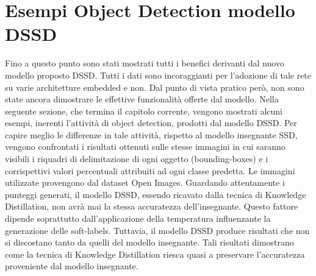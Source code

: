 \section{Esempi Object Detection modello DSSD}
Fino a questo punto sono stati mostrati tutti i benefici derivanti dal nuovo modello proposto DSSD. Tutti i dati sono incoraggianti per l'adozione di tale rete su varie architetture embedded e non. Dal punto di vista pratico però, non sono state ancora dimostrare le effettive funzionalità offerte dal modello. Nella seguente sezione, che termina il capitolo corrente, vengono mostrati alcuni esempi, inerenti l'attività di object detection, prodotti dal modello DSSD. Per capire meglio le differenze in tale attività, rispetto al modello insegnante SSD, vengono confrontati i risultati ottenuti sulle stesse immagini in cui saranno visibili i riquadri di delimitazione di ogni oggetto (bounding-boxes) e i corrispettivi valori percentuali attribuiti ad ogni classe predetta. 
Le immagini utilizzate provengono dal dataset Open Images.
Guardando attentamente i punteggi generati, il modello DSSD, essendo ricavato dalla tecnica di Knowledge Distillation, non avrà mai la stessa accuratezza dell'insegnante. Questo fattore dipende soprattutto dall'applicazione della temperatura influenzante la generazione delle soft-labels. 
Tuttavia, il modello DSSD produce risultati che non si discostano tanto da quelli del modello insegnante. Tali risultati dimostrano come la tecnica di Knowledge Distillation riesca quasi a preservare l'accuratezza proveniente dal modello insegnante. 
